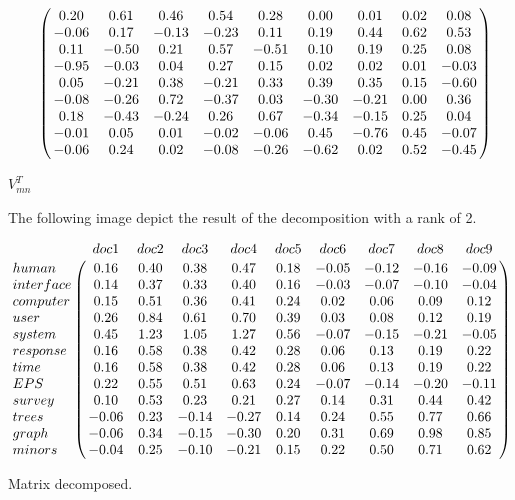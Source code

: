 \clearpage
\begin{table}[h!]
	\begin{equation} \nonumber
	\bordermatrix{~  \cr	
		& 0.20 & 0.61 & 0.46 & 0.54 & 0.28 & 0.00 & 0.01 & 0.02 & 0.08 \cr
		& -0.06 & 0.17 & -0.13 & -0.23 & 0.11 & 0.19 & 0.44 & 0.62 & 0.53 \cr
		& 0.11 & -0.50 & 0.21 & 0.57 & -0.51 & 0.10 & 0.19 & 0.25 & 0.08 \cr
		& -0.95 & -0.03 & 0.04 & 0.27 & 0.15 & 0.02 & 0.02 & 0.01 & -0.03 \cr
		& 0.05 & -0.21 & 0.38 & -0.21 & 0.33 & 0.39 & 0.35 & 0.15 & -0.60 \cr
		& -0.08 & -0.26 & 0.72 & -0.37 & 0.03 & -0.30 & -0.21 & 0.00 & 0.36 \cr
		& 0.18 & -0.43 & -0.24 & 0.26 & 0.67 & -0.34 & -0.15 & 0.25 & 0.04 \cr
		& -0.01 & 0.05 & 0.01 & -0.02 & -0.06 & 0.45 & -0.76 & 0.45 & -0.07 \cr
		& -0.06 & 0.24 & 0.02 & -0.08 & -0.26 & -0.62 & 0.02 & 0.52 & -0.45 \cr	 
 }
	\end{equation}
	\caption{$V_{mn}^{T}$}
	\label{fig:TDM}
\end{table}

The following image depict the result of the decomposition with a rank of 2.
\begin{table}[h!]
	\begin{equation} \nonumber
	\bordermatrix{~ & doc1 & doc2 & doc3 & doc4 & doc5 & doc6 & doc7 & doc8 & doc9 \cr	
		human 	& 0.16 & 0.40 & 0.38 & 0.47 & 0.18 & -0.05 & -0.12 & -0.16 & -0.09 \cr
		interface 	& 0.14 & 0.37 & 0.33 & 0.40 & 0.16 & -0.03 & -0.07 & -0.10 & -0.04 \cr
		computer	& 0.15 & 0.51 & 0.36 & 0.41 & 0.24 & 0.02 & 0.06 & 0.09 & 0.12 \cr
		user 		& 0.26 & 0.84 & 0.61 & 0.70 & 0.39 & 0.03 & 0.08 & 0.12 & 0.19 \cr
		system 	& 0.45 & 1.23 & 1.05 & 1.27 & 0.56 & -0.07 & -0.15 & -0.21 & -0.05 \cr
		response 	& 0.16 & 0.58 & 0.38 & 0.42 & 0.28 & 0.06 & 0.13 & 0.19 & 0.22 \cr
		time 		& 0.16 & 0.58 & 0.38 & 0.42 & 0.28 & 0.06 & 0.13 & 0.19 & 0.22 \cr
		EPS 	 	& 0.22 & 0.55 & 0.51 & 0.63 & 0.24 & -0.07 & -0.14 & -0.20 & -0.11 \cr 
		survey 	& 0.10 & 0.53 & 0.23 & 0.21 & 0.27 & 0.14 & 0.31 & 0.44 & 0.42 \cr
		trees 		& -0.06 & 0.23 & -0.14 & -0.27 & 0.14 & 0.24 & 0.55 & 0.77 & 0.66 \cr
		graph 		& -0.06 & 0.34 & -0.15 & -0.30 & 0.20 & 0.31 & 0.69 & 0.98 & 0.85 \cr
		minors 	& -0.04 & 0.25 & -0.10 & -0.21 & 0.15 & 0.22 & 0.50 & 0.71 & 0.62 \cr	  }
	\end{equation}
	\caption{Matrix decomposed.}
	\label{fig:TDM}
\end{table}
\clearpage

